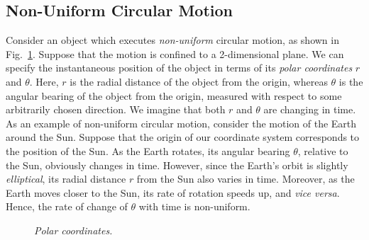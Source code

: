 \subsection{Non-Uniform Circular Motion}\label{s75}
Consider an object which executes {\em non-uniform} circular motion, as shown in Fig.~\ref{f62}.
Suppose that the motion is confined to a 2-dimensional plane. We can specify the
instantaneous position of the object in terms of its {\em polar coordinates} $r$ and
$\theta$. Here, $r$ is the radial distance of the object from the origin, whereas $\theta$
is the angular bearing of the object from the origin, measured with respect to some arbitrarily chosen
direction. We imagine that both $r$ and $\theta$ are changing in time. As an example of
non-uniform circular motion, consider the motion of the Earth around the Sun. Suppose that 
the origin of our coordinate system corresponds to the position of the Sun. As the Earth rotates, its
angular bearing $\theta$, relative to the Sun, obviously changes in time. 
However, since the
Earth's orbit is slightly {\em elliptical}, its radial distance $r$ from the
Sun also varies in time. Moreover, as the Earth moves closer to the Sun, its rate of
rotation speeds up, and {\em vice versa}. Hence, the rate of change of $\theta$ with
time is non-uniform.

\begin{figure}
\epsfysize=2.5in
\centerline{}
\caption{\em Polar coordinates.}\label{f62}  
\end{figure}

